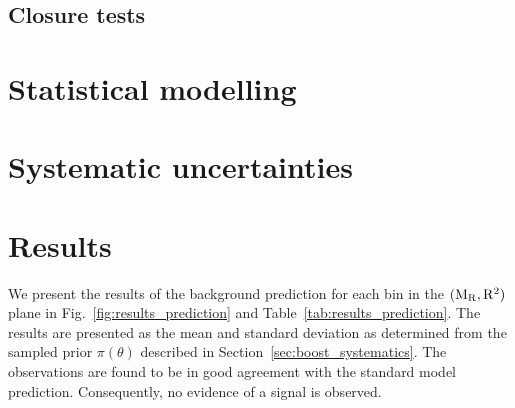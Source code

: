 

\subsection{Closure tests \label{sec:boost_closure_tests}}




\section{Statistical modelling \label{sec:boost_likelihood}}





\section{Systematic uncertainties \label{sec:boost_systematics}}





\section{Results \label{sec:boost_results}}

We present the results of the background prediction for each bin in the $(\mathrm{M_R},\mathrm{R^2})$ plane in
Fig.~\ref{fig:results_prediction} and Table~\ref{tab:results_prediction}. The results are presented
as the mean and standard deviation as determined from the sampled prior $\pi(\theta)$
described in Section~\ref{sec:boost_systematics}.  
The observations are found to be in good agreement with the standard model prediction. Consequently,
no evidence of a signal is observed. 

